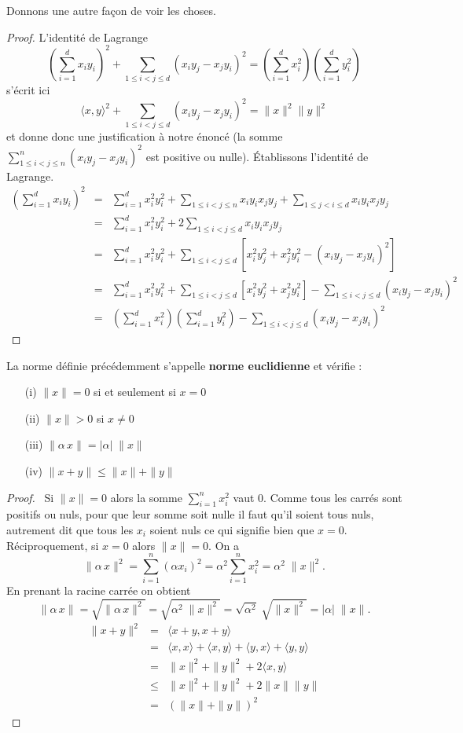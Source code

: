 \documentclass[class=report,crop=false]{standalone}
\begin{document}
Donnons une autre façon de voir les choses. 
\begin{proof}
L'identité de Lagrange
$$
(\sum_{i=1}^dx_iy_i)^2+\sum_{1\leq i<j\leq d}(x_iy_j-x_jy_i)^2=(\sum_{i=1}^dx_i^2)(\sum_{i=1}^dy_i^2)
$$ 
s'écrit ici
$$
\langle x, y\rangle^2+\sum_{1\leq i<j\leq d}(x_iy_j-x_jy_i)^2=\|x\|^2\|y\|^2
$$
et donne donc une justification \`a notre énoncé (la somme $\sum_{1\leq i<j\leq n}^n(x_iy_j-x_jy_i)^2$ est positive ou nulle). \'Etablissons l'identité de Lagrange.
\begin{eqnarray*}
(\sum_{i=1}^dx_iy_i)^2&=&\sum_{i=1}^dx_i^2y_i^2+\sum_{1\leq i<j\leq n}x_iy_ix_jy_j+\sum_{1\leq j<i\leq d}x_iy_ix_jy_j\\
&=&\sum_{i=1}^dx_i^2y_i^2+2\sum_{1\leq i<j\leq d}x_iy_ix_jy_j\\
&=&\sum_{i=1}^dx_i^2y_i^2+\sum_{1\leq i<j\leq d}[x_i^2y_j^2+x_j^2y_i^2-(x_iy_j-x_jy_i)^2]\\
&=&\sum_{i=1}^dx_i^2y_i^2+\sum_{1\leq i<j\leq d}[x_i^2y_j^2+x_j^2y_i^2]-\sum_{1\leq i<j\leq d}(x_iy_j-x_jy_i)^2\\
&=&(\sum_{i=1}^dx_i^2)(\sum_{i=1}^dy_i^2)-\sum_{1\leq i<j\leq d}(x_iy_j-x_jy_i)^2
\end{eqnarray*}
\end{proof}


\begin{theoreme} La norme définie précédemment s'appelle {\bf norme euclidienne} et vérifie :
\begin{enumerate}
\item[(i)] $\|x\| = 0$ si et seulement si $x = 0$
\item[(ii)] $\|x\| > 0$ si  $x \neq 0$
\item[(iii)] $\|\alpha\, x\| = |\alpha|\; \|x\|$
\item[(iv)] $\|x + y\| \leqslant \|x\| + \|y\|$
\end{enumerate}
\end{theoreme}

\begin{proof} \ Si $\|x\| = 0$ alors la somme $\sum_{i=1}^nx_i^2$ vaut 0. Comme tous les carrés sont positifs ou nuls, pour que leur somme soit nulle il faut qu'il soient tous nuls, autrement dit que tous les $x_i$ soient nuls ce qui signifie bien que $x=0$. Réciproquement, si $x=0$ alors $\|x\| = 0$.
On a
$$
\|\alpha\, x\|^2 = \sum_{i=1}^n(\alpha x_i)^2=\alpha^2\sum_{i=1}^nx_i^2=\alpha^2\; \|x\|^2.
$$
En prenant la racine carrée on obtient
$$
\|\alpha\, x\|=\sqrt{\|\alpha\, x\|^2}=\sqrt{\alpha^2\; \|x\|^2}=\sqrt{\alpha^2}\; \sqrt{\|x\|^2}= |\alpha|\; \|x\|.
$$
\begin{eqnarray*}
\|x + y\|^2&=&\langle x+y,x+ y\rangle\\
&=&\langle x, x\rangle+\langle x, y\rangle+\langle y, x\rangle+\langle y, y\rangle\\
&=&\|x\| ^2+\|y\|^2+2 \langle x, y\rangle\\
&\leq&\|x\| ^2+\|y\|^2+2\|x\|\|y\|\\
&=&(\|x\| +\| y\|)^2
\end{eqnarray*}
\end{proof}
\end{document}
